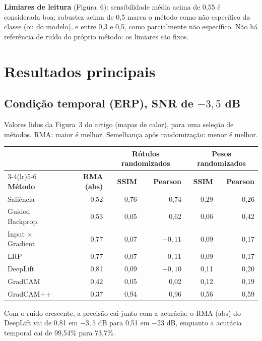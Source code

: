 \documentclass[11pt,a4paper]{article}
\begin{document}
\textbf{Limiares de leitura} (Figura~6): sensibilidade média acima de 0,55 é considerada boa; robustez acima de 0,5 marca o método como não específico da classe (ou do modelo), e entre 0,3 e 0,5, como parcialmente não específico. Não há referência de ruído do próprio método: os limiares são fixos.

\section{Resultados principais}
\subsection{Condição temporal (ERP), SNR de $-3{,}5$ dB}
Valores lidos da Figura~3 do artigo (mapas de calor), para uma seleção de métodos. RMA: maior é melhor. Semelhança após randomização: menor é melhor.
\begin{center}\small
\begin{tabular}{lrrrrr}
\toprule
& & \multicolumn{2}{c}{\textbf{Rótulos randomizados}} & \multicolumn{2}{c}{\textbf{Pesos randomizados}} \\
\cmidrule(lr){3-4}\cmidrule(lr){5-6}
\textbf{Método} & \textbf{RMA (abs)} & \textbf{SSIM} & \textbf{Pearson} & \textbf{SSIM} & \textbf{Pearson} \\
\midrule
Saliência             & 0,52 & 0,76 & 0,74 & 0,29 & 0,26 \\
Guided Backprop.      & 0,53 & 0,05 & 0,62 & 0,06 & 0,42 \\
Input $\times$ Gradient & 0,77 & 0,07 & $-0{,}11$ & 0,09 & 0,17 \\
LRP                   & 0,77 & 0,07 & $-0{,}11$ & 0,09 & 0,17 \\
DeepLift              & 0,81 & 0,09 & $-0{,}10$ & 0,11 & 0,20 \\
GradCAM               & 0,42 & 0,05 & 0,02 & 0,12 & 0,19 \\
GradCAM++             & 0,37 & 0,94 & 0,96 & 0,56 & 0,59 \\
\bottomrule
\end{tabular}
\end{center}
Com o ruído crescente, a precisão cai junto com a acurácia: o RMA (abs) do DeepLift vai de 0,81 em $-3{,}5$ dB para 0,51 em $-23$ dB, enquanto a acurácia temporal cai de 99,54\% para 73,7\%.
\end{document}
